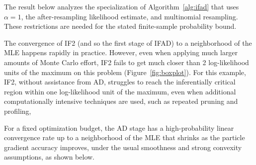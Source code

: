 \documentclass[numsec,webpdf,modern,medium,namedate]{oup-authoring-template}
\begin{document}
The result below analyzes the specialization of Algorithm~\ref{alg:ifad} that
uses $\alpha=1$, the after-resampling likelihood estimate, and multinomial
resampling.  These restrictions are needed for the stated finite-sample
probability bound.

The convergence of IF2 (and so the first stage of IFAD) to a neighborhood of the MLE happens rapidly in practice. 
However, even when applying much larger amounts of Monte Carlo effort, IF2 fails to get much closer than 2 log-likelihood units of the maximum on this problem (Figure~\ref{fig:boxplot}).
For this example, IF2, without assistance from AD, struggles to reach the inferentially critical region within one log-likelihood unit of the maximum, even when additional computationally intensive techniques are used, such as repeated pruning and profiling,


For a fixed optimization budget, the AD stage has a high-probability linear
convergence rate up to a neighborhood of the MLE that shrinks as the particle
gradient accuracy improves, under the usual smoothness and strong convexity
assumptions, as shown below.
\end{document}
